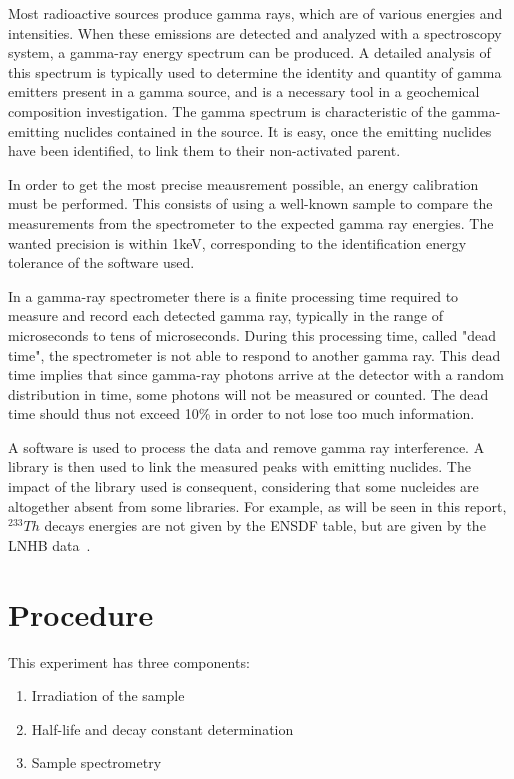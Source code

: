 Most radioactive sources produce gamma rays, which are of various energies and intensities. When these emissions are detected and analyzed with a spectroscopy system, a gamma-ray energy spectrum can be produced. A detailed analysis of this spectrum is typically used to determine the identity and quantity of gamma emitters present in a gamma source, and is a necessary tool in a geochemical composition investigation. The gamma spectrum is characteristic of the gamma-emitting nuclides contained in the source. It is easy, once the emitting nuclides have been identified, to link them to their non-activated parent.

In order to get the most precise meausrement possible, an energy calibration must be performed. This consists of using a well-known sample to compare the measurements from the spectrometer to the expected gamma ray energies. The wanted precision is within 1keV, corresponding to the identification energy tolerance of the software used.

In a gamma-ray spectrometer there is a finite processing time required to measure and record each detected gamma ray, typically in the range of microseconds to tens of microseconds. During this processing time, called "dead time", the spectrometer is not able to respond to another gamma ray. This dead time implies that since gamma-ray photons arrive at the detector with a random distribution in time, some photons will not be measured or counted. The dead time should thus not exceed 10\% in order to not lose too much information.

A software is used to process the data and remove gamma ray interference. A library is then used to link the measured peaks with emitting nuclides. The impact of the library used is consequent, considering that some nucleides are altogether absent from some libraries. For example, as will be seen in this report, $^{233}Th$ decays energies are not given by the ENSDF table, but are given by the LNHB data~\cite{lnhb01}. 


\section{Procedure}
\label{sec:procedure}

This experiment has three components:

\begin{enumerate}
\item Irradiation of the sample
\item Half-life and decay constant determination
\item Sample spectrometry
\end{enumerate}

